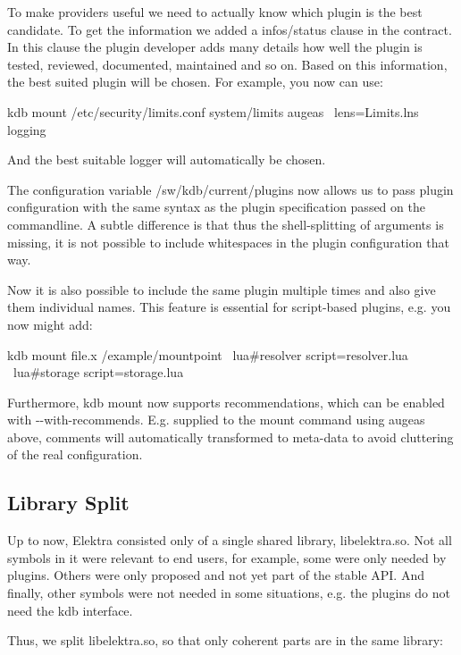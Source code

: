 To make providers useful we need to actually know which plugin is the best candidate. To get the information we added a {\ttfamily infos/status} clause in the contract. In this clause the plugin developer adds many details how well the plugin is tested, reviewed, documented, maintained and so on. Based on this information, the best suited plugin will be chosen. For example, you now can use\+: \begin{DoxyVerb}    kdb mount /etc/security/limits.conf system/limits augeas \
            lens=Limits.lns logging
\end{DoxyVerb}


And the best suitable logger will automatically be chosen.

The configuration variable {\ttfamily /sw/kdb/current/plugins} now allows us to pass plugin configuration with the same syntax as the plugin specification passed on the commandline. A subtle difference is that thus the shell-\/splitting of arguments is missing, it is not possible to include whitespaces in the plugin configuration that way.

Now it is also possible to include the same plugin multiple times and also give them individual names. This feature is essential for script-\/based plugins, e.\+g. you now might add\+: \begin{DoxyVerb}    kdb mount file.x /example/mountpoint \
            lua#resolver script=resolver.lua \
            lua#storage script=storage.lua
\end{DoxyVerb}


Furthermore, {\ttfamily kdb mount} now supports recommendations, which can be enabled with {\ttfamily -\/-\/with-\/recommends}. E.\+g. supplied to the mount command using augeas above, comments will automatically transformed to meta-\/data to avoid cluttering of the real configuration.

\subsection*{Library Split}

Up to now, Elektra consisted only of a single shared library, {\ttfamily libelektra.\+so}. Not all symbols in it were relevant to end users, for example, some were only needed by plugins. Others were only proposed and not yet part of the stable A\+P\+I. And finally, other symbols were not needed in some situations, e.\+g. the plugins do not need the {\ttfamily kdb} interface.

Thus, we split {\ttfamily libelektra.\+so}, so that only coherent parts are in the same library\+:


